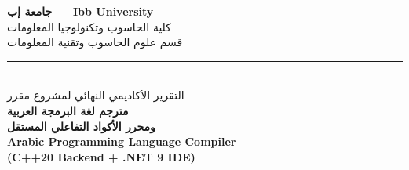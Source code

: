 \documentclass[12pt,a4paper]{report}
\begin{document}
\onehalfspacing

\begin{titlepage}
\begin{center}

\vspace*{0.5cm}

{\LARGE\bfseries\color{PrimaryBlue}\arabicfont جامعة إب — Ibb University}\\[0.4cm]
{\large\color{SecondaryBlue}\arabicfont كلية الحاسوب وتكنولوجيا المعلومات}\\
{\large\color{SecondaryBlue}\arabicfont قسم علوم الحاسوب وتقنية المعلومات}\\[0.6cm]

\textcolor{GoldYellow}{\rule{\textwidth}{2.5pt}}\\[1.0cm]

{\large\color{GoldYellow}\arabicfont التقرير الأكاديمي النهائي لمشروع مقرر}\\[0.5cm]

{\Huge\bfseries\color{PrimaryBlue}\arabicfont مترجم لغة البرمجة العربية}\\[0.3cm]
{\LARGE\bfseries\color{PrimaryBlue}\arabicfont ومحرر الأكواد التفاعلي المستقل}\\[0.5cm]

{\Large\bfseries\color{AccentCyan}
    Arabic Programming Language Compiler \\
    (C++20 Backend + .NET 9 IDE)
}\\[1.2cm]


\end{center}
\end{titlepage}
\end{document}
